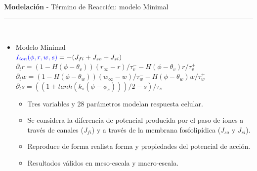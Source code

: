 \documentclass[11pt]{beamer}
\begin{document}
\begin{frame}[t]
	\vspace*{0.5 cm} \textbf{Modelación} - Término de Reacción: modelo Minimal	
	\color{brown}\rule{\linewidth}{4pt} \\ [0.2 cm]
	\begin{itemize}
		\item Modelo Minimal \\[0.2 cm]
		\centering	$ \color{blue} I_{ion}(\phi, r, w, s) \color{black} = - (J_{fi} + J_{so} + J_{si}) $ \\[.1 cm]

		\flushleft
		$\partial_t r = (1 - H(\phi - \theta_v))(r_\infty - r)/\tau_{v}^- - H(\phi - \theta_v)r/\tau_v^+ $ \\
		$\partial_t w = (1 - H(\phi - \theta_w))(w_\infty - w)/\tau_{w}^- - H(\phi - \theta_w)w/\tau_w^+ $ \\
		$\partial_t s = ((1 + tanh(k_s(\phi - \phi_s)))/2 - s)/\tau_s $ \\[.1 cm]

		\begin{itemize}
			\item Tres variables y 28 parámetros modelan respuesta celular.
			\item Se considera la diferencia de potencial producida por el paso de iones a través de canales ($J_{fi}$) y a través de la membrana fosfolipídica ($J_{so}$ y $J_{si}$).
			\item Reproduce de forma realista forma y propiedades del potencial de acción.
			\item Resultados válidos en meso-escala y macro-escala.
		\end{itemize}		
	\end{itemize}
\end{frame}
\end{document}

